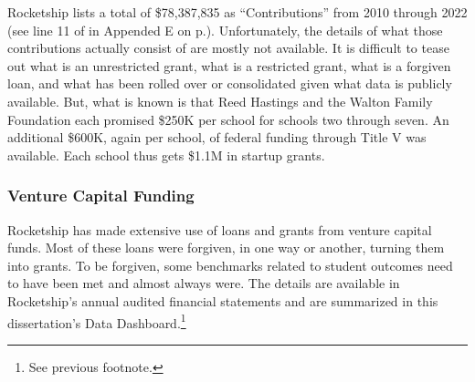 Rocketship lists a total of \$78,387,835 as ``Contributions'' from 2010 through 2022 (see line 11 of  in Appended E on p.\pageref{tab:consolidated_activities}). Unfortunately, the details of what those contributions actually consist of are mostly not available. It is difficult to tease out what is an unrestricted grant, what is a restricted grant, what is a forgiven loan, and what has been rolled over or consolidated given what data is publicly available. But, what is known is that Reed Hastings and the Walton Family Foundation each promised \$250K per school for schools two through seven. An additional \$600K, again per school, of federal funding through Title V was available. Each school thus gets \$1.1M in startup grants.

\subsubsection{Venture Capital Funding}%
\label{sec:venture-capital_funding}\indent%

Rocketship has made extensive use of loans and grants from venture capital funds. Most of these loans were forgiven, in one way or another, turning them into grants. To be forgiven, some benchmarks related to student outcomes need to have been met and almost always were. The details are available in Rocketship's annual audited financial statements and are summarized in this dissertation's Data Dashboard.\footnote{See previous footnote.}

